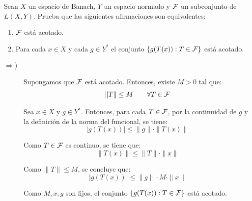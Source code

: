 \documentclass[12pt]{article}
\begin{document}
    \begin{ejercicio}[1.5 puntos]
        Sean $X$ un espacio de Banach, $Y$ un espacio normado y $\mathcal{F}$ un subconjunto de $L(X,Y)$. Prueba que las siguientes afirmaciones son equivalentes:
        \begin{enumerate}[label=\alph*)]
            \item $\mathcal{F}$ está acotado.
            \item Para cada $x\in X$ y cada $g\in Y^\ast$ el conjunto $\{g(T(x)) : T\in \mathcal{F}\}$ está acotado.
        \end{enumerate}
        \begin{description}
            \item[$\Longrightarrow$)] Supongamos que $\mathcal{F}$ está acotado. Entonces, existe $M>0$ tal que:
            \begin{equation*}
                \|T\| \leq M \qquad \forall T\in \mathcal{F}
            \end{equation*}

            Sea $x\in X$ y $g\in Y^\ast$. Entonces, para cada $T\in \mathcal{F}$, por la continuidad de $g$ y la definición de la norma del funcional, se tiene:
            \begin{equation*}
                |g(T(x))| \leq \|g\|\cdot \|T(x)\|
            \end{equation*}

            Como $T\in \mathcal{F}$ es continuo, se tiene que:
            \begin{equation*}
                \|T(x)\| \leq \|T\|\cdot \|x\|
            \end{equation*}

            Como $\|T\| \leq M$, se concluye que:
            \begin{equation*}
                |g(T(x))| \leq \|g\|\cdot M \cdot \|x\|
            \end{equation*}

            Como $M, x, g$ son fijos, el conjunto $\{g(T(x)) : T\in \mathcal{F}\}$ está acotado.
        \end{description}
    \end{ejercicio}
\end{document}
